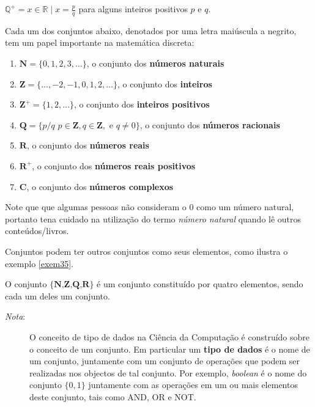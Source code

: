 \begin{center}$\mathbb{Q}^{+} = x \in \mathbb{R} \mid x = \frac{p}{q}$ para alguns
inteiros positivos $p$ e $q$.\end{center}

Cada um dos conjuntos abaixo, denotados por uma letra maiúscula a negrito, tem
um papel importante na matemática discreta:

\begin{enumerate}
  \item  $\textbf{N} = \{0,1,2,3,\ldots\}$, o conjunto dos \textbf{números
  naturais}
  \item $\textbf{Z} = \{\ldots,-2,-1,0,1,2,\ldots\}$, o conjunto dos
  \textbf{inteiros}
  \item $\textbf{Z}^+ = \{1,2,\ldots\}$, o conjunto dos \textbf{inteiros
  positivos}
  \item $\textbf{Q} = \{p/q$ \mid $p \in \textbf{Z}, q \in \textbf{Z},$ e $ q
  \neq 0\}$, o conjunto dos \textbf{números racionais}
  \item $\textbf{R}$, o conjunto dos \textbf{números reais}
  \item $\textbf{R}^+$, o conjunto dos \textbf{números reais positivos}
  \item $\textbf{C}$, o conjunto dos \textbf{números complexos}
\end{enumerate}

Note que que algumas pessoas não consideram o $0$ como um número natural,
portanto tena cuidado na utilização do termo \emph{número natural} quando lê
outros conteúdos/livros.

Conjuntos podem ter outros conjuntos como seus elementos, como ilustra o exemplo
\ref{exem35}.


\begin{exmp}
\label{exem35}
O conjunto $\{\textbf{N,Z,Q,R}\}$ é um conjunto constituído por quatro
elementos, sendo cada um deles um conjunto.
\end{exmp}

\begin{description}
\item[\emph{Nota}:] O conceito de tipo de dados na Ciência da Computação é
construído sobre o conceito de um conjunto. Em particular um \textbf{tipo de
dados} é o nome de um conjunto, juntamente com um conjunto de operações que
podem ser realizadas nos objectos de tal conjunto. Por exemplo, \emph{boolean} é
o nome do conjunto $\{0,1\}$ juntamente com as operações em um ou mais elementos
deste conjunto, tais como AND, OR e NOT.
\end{description}

